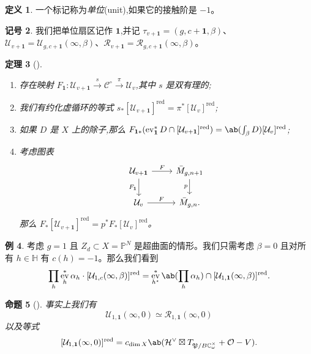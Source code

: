 \documentclass{amsart}
\newtheorem{thm}{定理}[section]
\newtheorem{prop}[thm]{命题}
\theoremstyle{definition}
\newtheorem{defn}[thm]{定义}
\newtheorem{exm}[thm]{例}
\newtheorem{notn}[thm]{记号}
\theoremstyle{remark}
\theoremstyle{plain}
\theoremstyle{definition}
\theoremstyle{remark}
\newcommand{\C}{\mathbb{C}}
\renewcommand{\H}{\mathbb{H}}
\renewcommand{\P}{\mathbb{P}}
\newcommand{\mc}[1]{\mathcal{#1}}
\newcommand{\mf}[1]{\mathfrak{#1}}
\newcommand{\mr}[1]{\mathrm{#1}}
\newcommand{\on}[1]{\operatorname{#1}}
\newcommand{\1}{\mathbf{1}}
\newcommand{\2}{\mathbf{2}}
\newcommand{\3}{\mathbf{3}}
\DeclareMathOperator{\ev}{ev}
\begin{document}
\begin{defn}
    一个标记称为\textit{单位}(unit),如果它的接触阶是 \(-1\)。
\end{defn}

\begin{notn}
    我们把单位扇区记作 \(\1\),并记 \(\tau_{v+\1} = (g, c+\1, \beta)\)、\(\mc{U}_{v+\1} = \mc{U}_{g, c+\1}(\infty, \beta)\)、\(\mc{R}_{v+\1} = \mc{R}_{g, c+\1}(\infty, \beta)\)。
\end{notn}

\begin{thm}[{\cite[Theorems~1.16--1.17]{CJRpunctured}}]\leavevmode
    \begin{enumerate}
        \item 存在映射 \(F_{\1} \colon \mc{U}_{v+\1} \xrightarrow{s} \mc{C}^{\circ} \xrightarrow{\pi} \mc{U}_v\),其中 \(s\) 是双有理的;
        \item 我们有约化虚循环的等式 \(s_* [\mc{U}_{v+\1}]^{\on{red}} = \pi^* [\mc{U}_v]^{\on{red}}\);
        \item 如果 \(D\) 是 \(X\) 上的除子,那么 \(F_{\1 *} (\ev_{\1}^* D \cap [\mc{U}_{v+\1}]^{\on{red}}) = \ab(\int_{\beta} D) [\mc{U}_v]^{\on{red}}\);
        \item 考虑图表
            \begin{equation*}
            \begin{tikzcd}
                \mc{U}_{v+\1} \ar{r}{F} \ar{d}[swap]{F_{\1}} & \bar{M}_{g,n+1} \ar{d}[swap]{p} \\
                \mc{U}_v \ar{r}{F} & \bar{M}_{g,n}.
            \end{tikzcd}
            \end{equation*}
            那么 \(F_* [\mc{U}_{v+\1}]^{\on{red}} = p^* F_* [\mc{U}_v]^{\on{red}}\)。
    \end{enumerate}
\end{thm}

\begin{exm}
    考虑 \(g = 1\) 且 \(Z_d \subset X = \P^N\) 是超曲面的情形。我们只需考虑 \(\beta = 0\) 且对所有 \(h \in \H\) 有 \(c(h) = -1\)。那么我们看到
    \[ \prod_h \ev_h^* \alpha_h \cdot [\mc{U}_{1,c}(\infty,\beta)]^{\mr{red}} = \ev_{h^{\star}}^* \ab(\prod_h \alpha_h) \cap [\mc{U}_{1,\1}(\infty,\beta)]^{\on{red}}. \]
\end{exm}

\begin{prop}[{\cite{CJRpunctured}}]
    事实上我们有
    \[ \mc{U}_{1,\1}(\infty, 0) \simeq \mc{R}_{1,\1}(\infty, 0) \]
    以及等式
    \[ [\mc{U}_{1,\1}(\infty, 0)]^{\on{red}} = c_{\dim X} \ab(\mc{H}^{\vee} \boxtimes T_{\mf{P}/B\C_{\omega}^{\times}} + \mc{O} - V). \]
\end{prop}
\end{document}
